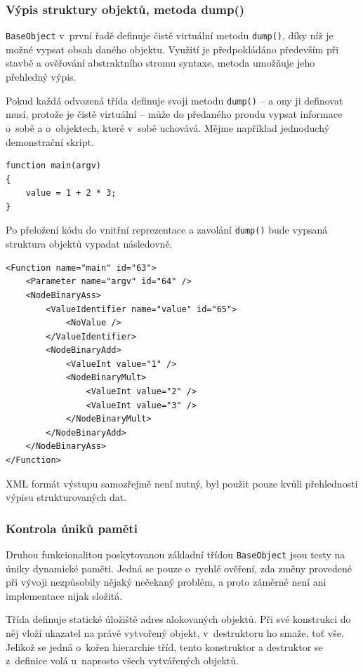 \documentclass[11pt,twoside,a4paper]{book}
\begin{document}
\subsubsection{Výpis struktury objektů, metoda dump()}

\texttt{BaseObject} v~první řadě definuje čistě virtuální metodu \texttt{dump()}, díky níž je možné vypsat obsah daného objektu. Využití je předpokládáno především při stavbě a ověřování abstraktního stromu syntaxe, metoda umožňuje jeho přehledný výpis.

Pokud každá odvozená třída definuje svoji metodu \texttt{dump()} -- a ony ji definovat musí, protože je čistě virtuální -- může do předaného proudu vypsat informace o~sobě a o~objektech, které v~sobě uchovává. Mějme na\-pří\-klad jednoduchý demonstrační skript.

\begin{verbatim}
function main(argv)
{
    value = 1 + 2 * 3;
}
\end{verbatim}

Po přeložení kódu do vnitřní reprezentace a zavolání \texttt{dump()} bude vypsaná struktura objektů vypadat následovně.

\begin{verbatim}
<Function name="main" id="63">
    <Parameter name="argv" id="64" />
    <NodeBinaryAss>
        <ValueIdentifier name="value" id="65">
            <NoValue />
        </ValueIdentifier>
        <NodeBinaryAdd>
            <ValueInt value="1" />
            <NodeBinaryMult>
                <ValueInt value="2" />
                <ValueInt value="3" />
            </NodeBinaryMult>
        </NodeBinaryAdd>
    </NodeBinaryAss>
</Function>
\end{verbatim}

XML formát výstupu samozřejmě není nutný, byl použit pouze kvůli přehlednosti výpisu strukturovaných dat.


\subsubsection{Kontrola úniků paměti}
\label{kontrola_uniku_pameti}

Druhou funkcionalitou poskytovanou základní třídou \texttt{BaseObject} jsou testy na úniky dynamické paměti. Jedná se pouze o~rychlé ověření, zda změny provedené při vývoji nezpůsobily nějaký nečekaný problém, a proto záměrně není ani implementace nijak složitá.

Třída definuje statické úložiště adres alokovaných objektů. Při své konstrukci do něj vloží ukazatel na právě vytvořený objekt, v~destruktoru ho smaže, toť vše. Jelikož se jedná o~kořen hierarchie tříd, tento konstruktor a destruktor se z~definice volá u~naprosto všech vytvářených objektů.
\end{document}
